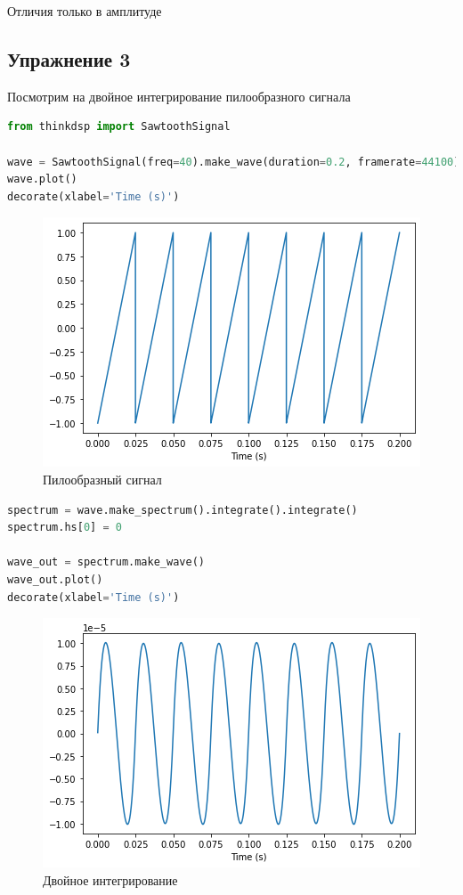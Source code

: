 Отличия только в амплитуде


\subsection{Упражнение 3}

Посмотрим на двойное интегрирование пилообразного сигнала

\begin{lstlisting}[language=Python]
from thinkdsp import SawtoothSignal

wave = SawtoothSignal(freq=40).make_wave(duration=0.2, framerate=44100)
wave.plot()
decorate(xlabel='Time (s)')
\end{lstlisting}

\begin{figure}[H]
	\begin{center}
		\includegraphics[scale=1]{fig/lab09/lab09_07.png}
		\caption{Пилообразный сигнал}
	\end{center}
\end{figure}


\begin{lstlisting}[language=Python]
spectrum = wave.make_spectrum().integrate().integrate()
spectrum.hs[0] = 0

wave_out = spectrum.make_wave()
wave_out.plot()
decorate(xlabel='Time (s)')
\end{lstlisting}

\begin{figure}[H]
	\begin{center}
		\includegraphics[scale=1]{fig/lab09/lab09_08.png}
		\caption{Двойное интегрирование}
	\end{center}
\end{figure}


